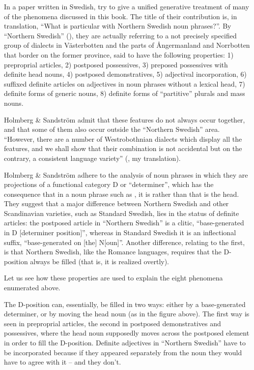In a paper written in Swedish, \citet{HolmbergEtAl2003} try to give a unified generative treatment of many of the phenomena discussed in this book. The title of their contribution is, in translation, “What is particular with Northern Swedish noun phrases?”. By “Northern Swedish” (), they are actually referring to a not precisely specified group of dialects in Västerbotten and the parts of Ångermanland and Norrbotten that border on the former province, said to have the following properties: 1) preproprial articles, 2) postposed possessives, 3) preposed possessives with definite head nouns, 4) postposed demonstratives, 5) adjectival incorporation, 6) suffixed definite articles on adjectives in noun phrases without a lexical head, 7) definite forms of generic nouns, 8) definite forms of “partitive” plurals and mass nouns.

Holmberg \& Sandström admit that these features do not always occur together, and that some of them also occur outside the “Northern Swedish” area. “However, there are a number of Westrobothnian dialects which display all the features, and we shall show that their combination is not accidental but on the contrary, a consistent language variety” (\citet[87]{HolmbergEtAl2003}, my translation).

Holmberg \& Sandström adhere to the analysis of noun phrases in which they are projections of a functional category D or “determiner”, which has the consequence that in a noun phrase such as , it is  rather than  that is the head. They suggest that a major difference between Northern Swedish and other Scandinavian varieties, such as Standard Swedish, lies in the status of definite articles: the postposed article in “Northern Swedish” is a clitic, “base-generated in D [determiner position]”, whereas in Standard Swedish it is an inflectional suffix, “base-generated on [the] N[oun]”. Another difference, relating to the first, is that Northern Swedish, like the Romance languages, requires that the D-position always be filled (that is, it is realized overtly).

Let us see how these properties are used to explain the eight phenomena enumerated above. 

The D-position can, essentially, be filled in two ways: either by a base-generated determiner, or by moving the head noun (as in the figure above). The first way is seen in preproprial articles, the second in postposed demonstratives and possessives, where the head noun supposedly moves across the postposed element in order to fill the D-position. Definite adjectives in “Northern Swedish” have to be incorporated because if they appeared separately from the noun they would have to agree with it – and they don’t. 

